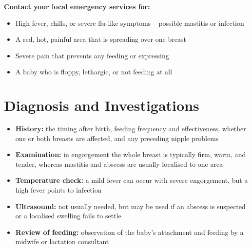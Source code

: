 \textbf{Contact your local emergency services for:}
\begin{itemize}
    \item High fever, chills, or severe flu-like symptoms -- possible mastitis or infection
    \item A red, hot, painful area that is spreading over one breast
    \item Severe pain that prevents any feeding or expressing
    \item A baby who is floppy, lethargic, or not feeding at all
\end{itemize}

\section*{Diagnosis and Investigations}
\begin{itemize}
    \item \textbf{History:} the timing after birth, feeding frequency and effectiveness, whether one or both breasts are affected, and any preceding nipple problems
    \item \textbf{Examination:} in engorgement the whole breast is typically firm, warm, and tender, whereas mastitis and abscess are usually localised to one area
    \item \textbf{Temperature check:} a mild fever can occur with severe engorgement, but a high fever points to infection
    \item \textbf{Ultrasound:} not usually needed, but may be used if an abscess is suspected or a localised swelling fails to settle
    \item \textbf{Review of feeding:} observation of the baby's attachment and feeding by a midwife or lactation consultant
\end{itemize}

